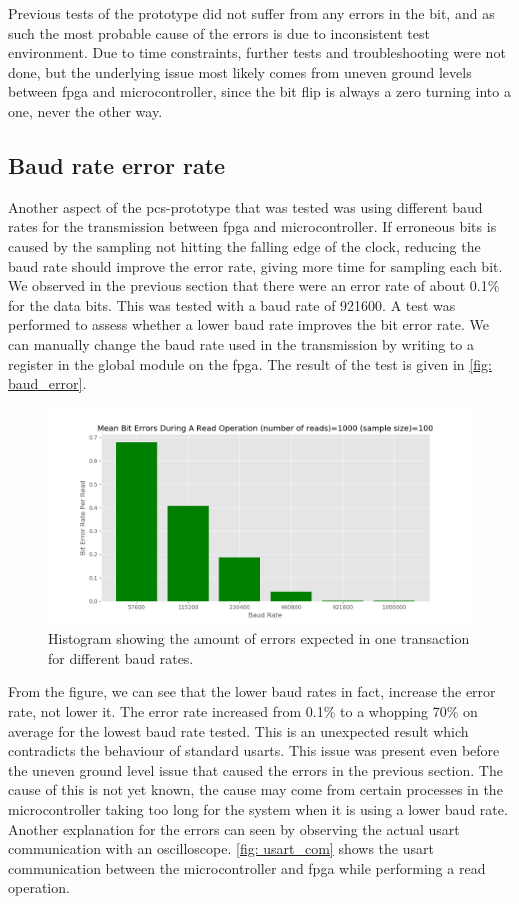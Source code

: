 \documentclass[main.tex]{subfiles}
\begin{document}
Previous tests of the prototype did not suffer from any errors in the bit, and as such the most probable cause of the errors is due to inconsistent test environment. Due to time constraints, further tests and troubleshooting were not done, but the underlying issue most likely comes from uneven ground levels between \gls{fpga} and microcontroller, since the bit flip is always a zero turning into a one, never the other way.

\subsection{Baud rate error rate}

Another aspect of the \gls{pcs}-prototype that was tested was using different baud rates for the transmission between \gls{fpga} and microcontroller. If erroneous bits is caused by the sampling not hitting the falling edge of the clock, reducing the baud rate should improve the error rate, giving more time for sampling each bit. We observed in the previous section that there were an error rate of about 0.1\% for the data bits. This was tested with a baud rate of 921600. A test was performed to assess whether a lower baud rate improves the bit error rate. We can manually change the baud rate used in the transmission by writing to a register in the global module on the \gls{fpga}. The result of the test is given in \autoref{fig: baud_error}.

\begin{figure}[!ht]
    \centering
    \includegraphics[width=18cm]{images/baud_error_rate.png}
    \caption{Histogram showing the amount of errors expected in one transaction for different baud rates.}
    \label{fig: baud_error}
\end{figure}
\FloatBarrier

From the figure, we can see that the lower baud rates in fact, increase the error rate, not lower it. The error rate increased from 0.1\% to a whopping 70\% on average for the lowest baud rate tested. This is an unexpected result which contradicts the behaviour of standard \gls{usart}s. This issue was present even before the uneven ground level issue that caused the errors in the previous section. The cause of this is not yet known, the cause may come from certain processes in the microcontroller taking too long for the system when it is using a lower baud rate. Another explanation for the errors can seen by observing the actual \gls{usart} communication with an oscilloscope. \autoref{fig: usart_com} shows the \gls{usart} communication between the microcontroller and \gls{fpga} while performing a read operation.
\end{document}
